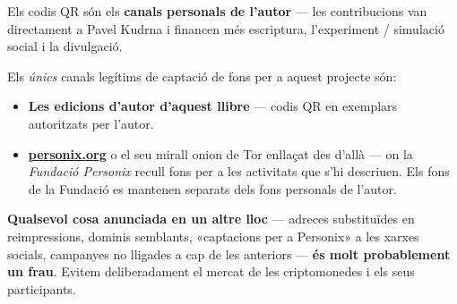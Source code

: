 \begin{minipage}[t]{0.60\textwidth}
\vspace{0pt}
\begin{mdframed}[
  linewidth=0.7pt,roundcorner=5pt,
  innerleftmargin=10pt,innerrightmargin=10pt,
  innertopmargin=8pt,innerbottommargin=8pt,
  skipabove=0pt,skipbelow=0pt,
  linecolor=cbwarning!50,backgroundcolor=cbwarning!5,
  nobreak=true,
  needspace=4\baselineskip,
]
\footnotesize
Els codis QR són els \textbf{canals personals de l'autor} --- les contribucions van directament a Pavel Kudrna i financen més escriptura, l'experiment / simulació social i la divulgació.

\smallskip
Els \emph{únics} canals legítims de captació de fons per a aquest projecte són:

\smallskip
\begin{itemize}
\setlength{\itemsep}{0pt}
\setlength{\topsep}{0pt}
\item \textbf{Les edicions d'autor d'aquest llibre} --- codis QR en exemplars autoritzats per l'autor.
\item \href{https://personix.org}{\textbf{personix.org}} o el seu mirall onion de Tor enllaçat des d'allà --- on la \emph{Fundació Personix} recull fons per a les activitats que s'hi descriuen. Els fons de la Fundació es mantenen separats dels fons personals de l'autor.
\end{itemize}

\smallskip
\textbf{Qualsevol cosa anunciada en un altre lloc} --- adreces substituïdes en reimpressions, dominis semblants, «captacions per a Personix» a les xarxes socials, campanyes no lligades a cap de les anteriors --- \textbf{és molt probablement un frau}. Evitem deliberadament el mercat de les criptomonedes i els seus participants.
\end{mdframed}
\end{minipage}

\clearpage
